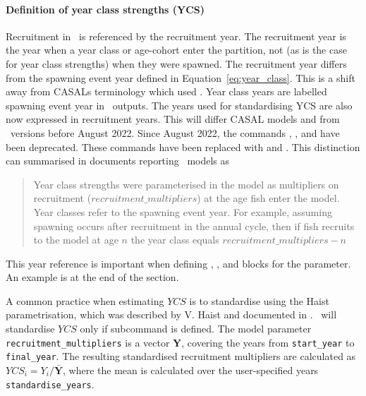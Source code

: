 \paragraph*{Definition of year class strengths (YCS)}\label{sec:DefinitionYCS}

Recruitment in \CNAME\ is referenced by the recruitment year. The recruitment year is the year when a year class or age-cohort enter the partition, not (as is the case for year class strengths) when they were spawned. The recruitment year differs from the spawning event year defined in Equation~\eqref{eq:year_class}. This is a shift away from CASALs terminology which used . Year class years are labelled spawning event year in \CNAME\ outputs. The years used for standardising YCS are also now expressed in recruitment years. This will differ CASAL models and from \CNAME\ versions before August 2022. Since August 2022, the commands , , and  have been deprecated. These commands have been replaced with  and . This distinction can summarised in documents reporting \CNAME\ models as \begin{quote}Year class strengths were parameterised in the model as multipliers on recruitment ($recruitment\_multipliers$) at the age fish enter the model. Year classes refer to the spawning event year. For example, assuming spawning occurs after recruitment in the annual cycle, then if fish recruits to the model at age $n$ the year class equals $recruitment\_multipliers - n$\end{quote}

This year reference is important when defining , , and  blocks for the  parameter. An example is at the end of the section.

A common practice when estimating $YCS$ is to standardise using the Haist parametrisation, which was described by V. Haist and documented in \cite{1388}. \CNAME\ will standardise $YCS$ only if subcommand  is defined. The model parameter \texttt{recruitment\_multipliers} is a vector \textbf{Y}, covering the years from \texttt{start\_year} to \texttt{final\_year}. The resulting standardised recruitment multipliers are calculated as $YCS_i=Y_i/\bar{\textbf{Y}}$, where the mean is calculated over the user-specified years \texttt{standardise\_years}.


